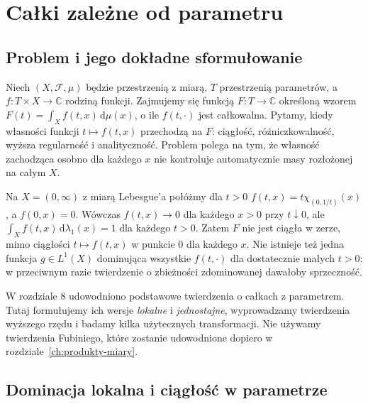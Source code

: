 \chapter{Całki zależne od parametru}
\label{ch:parametry-calki}

\section{Problem i jego dokładne sformułowanie}

Niech $(X,\mathcal F,\mu)$ będzie przestrzenią z miarą, $T$ przestrzenią
parametrów, a $f:T\times X\to\mathbb C$ rodziną funkcji. Zajmujemy się
funkcją $F:T\to\mathbb C$ określoną wzorem
$F(t)=\int_X f(t,x)\,\mathrm d\mu(x)$, o ile $f(t,\cdot)$ jest całkowalna.
Pytamy, kiedy własności funkcji $t\mapsto f(t,x)$ przechodzą na $F$:
ciągłość, różniczkowalność, wyższa regularność i analityczność. Problem
polega na tym, że własność zachodząca osobno dla każdego $x$ nie
kontroluje automatycznie masy rozłożonej na całym $X$.

\begin{przyklad}
\label{ex:params-escape-11}
Na $X=(0,\infty)$ z miarą Lebesgue'a połóżmy dla $t>0$
$f(t,x)=t\chi_{(0,1/t)}(x)$, a $f(0,x)=0$.
Wówczas $f(t,x)\to0$ dla każdego $x>0$ przy $t\downarrow0$,
ale $\int_X f(t,x)\,\mathrm d\lambda_1(x)=1$ dla każdego $t>0$.
Zatem $F$ nie jest ciągła w zerze, mimo ciągłości $t\mapsto f(t,x)$
w punkcie $0$ dla każdego $x$. Nie istnieje też jedna funkcja
$g\in L^1(X)$ dominująca wszystkie $f(t,\cdot)$ dla dostatecznie
małych $t>0$: w przeciwnym razie twierdzenie o zbieżności
zdominowanej dawałoby sprzeczność.
\end{przyklad}

\begin{uwaga}
W rozdziale 8 udowodniono podstawowe twierdzenia o całkach z parametrem.
Tutaj formułujemy ich wersje \emph{lokalne} i \emph{jednostajne},
wyprowadzamy twierdzenia wyższego rzędu i badamy kilka użytecznych
transformacji. Nie używamy twierdzenia Fubiniego, które zostanie
udowodnione dopiero w rozdziale~\ref{ch:produkty-miary}.
\end{uwaga}

\section{Dominacja lokalna i ciągłość w parametrze}

